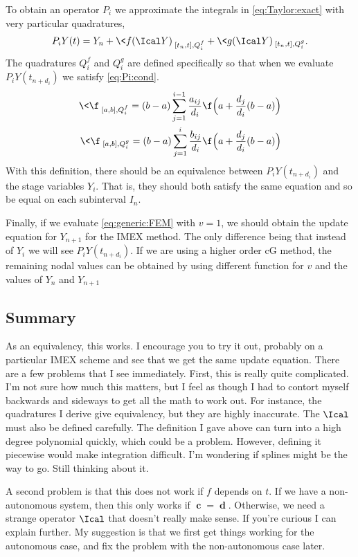 \documentclass{amsart}
\begin{document}
To obtain an operator $P_i$ we approximate the integrals in \eqref{eq:Taylor:exact} with very particular quadratures,
\begin{align}
	P_iY(t) = Y_n + \<f(\Ical Y)\>_{[t_n,t],Q_i^f} + \< g(\Ical Y)\>_{[t_n,t],Q_i^g}.	
\end{align}
The quadratures $Q_i^f$ and $Q_i^g$ are defined specifically so that when we evaluate $P_iY(t_{n+d_i})$ we satisfy \eqref{eq:Pi:cond}.  
\begin{align}
	\< \f \>_{[a,b],Q_i^f} = (b-a) \sum_{j=1}^{i-1} \frac{a_{ij}}{d_i}\f\Big(a + \frac{d_j}{d_i}(b-a) \Big) \\
	\< \f \>_{[a,b],Q_i^g} = (b-a) \sum_{j=1}^{i} \frac{b_{ij}}{d_i}\f \Big(a + \frac{d_j}{d_i}(b-a) \Big)
\end{align}
With this definition, there should be an equivalence between $P_iY(t_{n+d_i})$ and the stage variables $Y_i$.  That is, they should both satisfy the same equation and so be equal on each subinterval $I_n$.  

Finally, if we evaluate \eqref{eq:generic:FEM} with $v=1$, we should obtain the update equation for $Y_{n+1}$ for the IMEX method.  The only difference being that instead of $Y_i$ we will see $P_iY(t_{n+d_i})$.  If we are using a higher order cG method, the remaining nodal values can be obtained by using different function for $v$ and the values of $Y_n$ and $Y_{n+1}$


\subsection*{Summary}
	As an equivalency, this works.  I encourage you to try it out, probably on a particular IMEX scheme and see that we get the same update equation.  There are a few problems that I see immediately.  First, this is really quite complicated.  I'm not sure how much this matters, but I feel as though I had to contort myself backwards and sideways to get all the math to work out.  For instance, the quadratures I derive give equivalency, but they are highly inaccurate.  The $\Ical$ must also be defined carefully.  The definition I gave above can turn into a high degree polynomial quickly, which could be a problem.  However, defining it piecewise would make integration difficult.  I'm wondering if splines might be the way to go.  Still thinking about it.
	
	A second problem is that this does not work if $f$ depends on $t$.  If we have a non-autonomous system, then this only works if $\mbfc = \mbfd$.  Otherwise, we need a strange operator $\Ical$ that doesn't really make sense.  If you're curious I can explain further.  My suggestion is that we first get things working for the autonomous case, and fix the problem with the non-autonomous case later.
	
\end{document}

